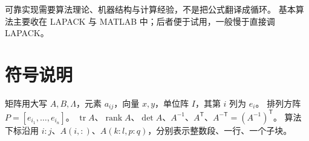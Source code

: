 可靠实现需要算法理论、机器结构与计算经验，不是把公式翻译成循环。
基本算法主要收在 LAPACK 与 MATLAB 中；后者便于试用，一般慢于直接调 LAPACK。

\section{符号说明}

矩阵用大写 $A,B,\Lambda$，元素 $a_{ij}$，向量 $x,y$，单位阵 $I$，其第 $i$ 列为 $e_i$。
排列方阵 $P=[e_{i_1},\ldots,e_{i_n}]$。
$\operatorname{tr}A$、$\operatorname{rank}A$、$\det A$、$A^{-1}$、$A^{\mathsf T}$、$A^{-\mathsf T}=(A^{-1})^{\mathsf T}$。
算法下标沿用 $i:j$、$A(i,:)$、$A(k:l,p:q)$，分别表示整数段、一行、一个子块。

\renewcommand{\thesection}{\thechapter.\arabic{section}}
